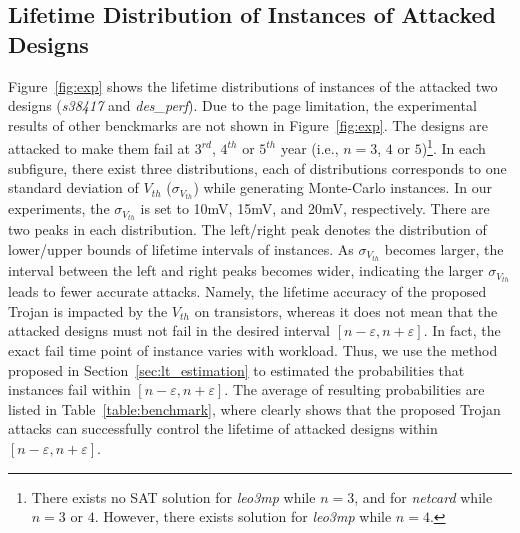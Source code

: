 \subsection{Lifetime Distribution of Instances of Attacked Designs}
\label{sec:exp:exp}
Figure~\ref{fig:exp} shows the lifetime distributions of instances of the attacked two designs (\textit{s38417} and \textit{des\_perf}). Due to the page limitation, the experimental results of other benckmarks are not shown in Figure~\ref{fig:exp}. The designs are attacked to make them fail at $3^{rd}$, $4^{th}$ or $5^{th}$ year (i.e., $n = 3$, $4$ or $5$)\footnote{There exists no SAT solution for \textit{leo3mp} while $n = 3$, and for \textit{netcard} while $n = 3$ or $4$. However, there exists solution for \textit{leo3mp} while $n = 4$.}.
In each subfigure, there exist three distributions, each of distributions corresponds to one standard deviation of $V_{th}$ ($\sigma_{V_{th}}$) while generating Monte-Carlo instances. In our experiments, the $\sigma_{V_{th}}$ is set to 10mV, 15mV, and 20mV, respectively. There are two peaks in each distribution. The left/right peak denotes the distribution of lower/upper bounds of lifetime intervals of instances. %
As $\sigma_{V_{th}}$ becomes larger, the interval between the left and right peaks becomes wider, indicating the larger $\sigma_{V_{th}}$ leads to fewer accurate attacks. Namely, the lifetime accuracy of the proposed Trojan is impacted by the $V_{th}$ on transistors, whereas it does not mean that the attacked designs must not fail in the desired interval $[n-\varepsilon,n+\varepsilon]$. In fact, the exact fail time point of instance varies with workload.  Thus, we use the method proposed in Section~\ref{sec:lt_estimation} to estimated the probabilities that instances fail within $[n-\varepsilon,n+\varepsilon]$. The average of resulting probabilities are listed in Table~\ref{table:benchmark}, where clearly shows that the proposed Trojan attacks can successfully control the lifetime of attacked designs within $[n-\varepsilon,n+\varepsilon]$.%

